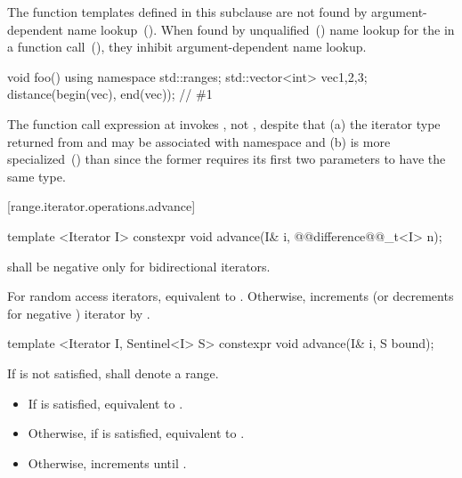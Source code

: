 \pnum
The function templates defined in this subclause are not found by argument-dependent
name lookup~(). When found by
unqualified~() name lookup for the
 in a function call~(), they
inhibit argument-dependent name lookup.

\begin{example}
\begin{codeblock}
void foo() {
    using namespace std::ranges;
    std::vector<int> vec{1,2,3};
    distance(begin(vec), end(vec)); // \#1
}
\end{codeblock}
The function call expression at  invokes ,
not , despite that (a) the iterator type returned from 
and  may be associated with namespace  and (b)
 is more specialized~() than
 since the former requires its first two parameters
to have the same type.
\end{example}

[range.iterator.operations.advance]{}
%

\begin{itemdecl}
template <Iterator I>
  constexpr void advance(I& i, @@difference@@_t<I> n);
\end{itemdecl}

\begin{itemdescr}
\pnum
\requires
{}
shall be negative only for bidirectional iterators.

\pnum
\effects
For random access iterators, equivalent to .
Otherwise, increments (or decrements for negative
)
iterator
by
.
\end{itemdescr}

\begin{itemdecl}
template <Iterator I, Sentinel<I> S>
  constexpr void advance(I& i, S bound);
\end{itemdecl}

\begin{itemdescr}
\pnum
\requires
If
 is not satisfied, 
shall denote a range.

\pnum
\effects
\begin{itemize}
\item If  is satisfied,
      equivalent to .

\item Otherwise, if
       is satisfied, equivalent to .

\item Otherwise, increments  until .
\end{itemize}
\end{itemdescr}

